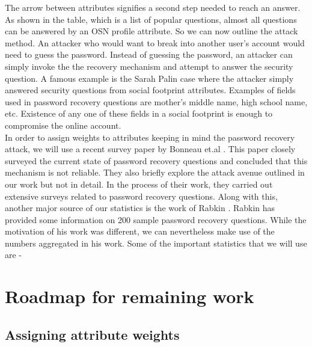 \documentclass[10pt,conference]{IEEEtran}
\begin{document}
The arrow between attributes signifies a second step needed to reach an answer. As shown in the table, which is a list of popular questions, almost all questions can be answered by an OSN profile attribute. So we can now outline the attack method. An attacker who would want to break into another user's account would need to guess the password. Instead of guessing the password, an attacker can simply invoke the the recovery mechanism and attempt to answer the security question. A famous example is the Sarah Palin case where the attacker simply answered security questions from social footprint attributes. Examples of fields used in password recovery questions are mother’s middle name, high school name, etc. Existence of any one of these fields in a social footprint is enough to compromise the online account. \\

In order to assign weights to attributes keeping in mind the password recovery attack, we will use a recent survey paper by Bonneau et.al \cite{google}. This paper closely surveyed the current state of password recovery questions and concluded that this mechanism is not reliable. They also briefly explore the attack avenue outlined in our work but not in detail. In the process of their work, they carried out extensive surveys related to password recovery questions. Along with this, another major source of our statistics is the work of Rabkin \cite{recovery}. Rabkin has provided some information on 200 sample password recovery questions. While the motivation of his work was different, we can nevertheless make use of the numbers aggregated in his work. Some of the important statistics that we will use are -
 
 

\section{Roadmap for remaining work}
\subsection{Assigning attribute weights}
\end{document}
